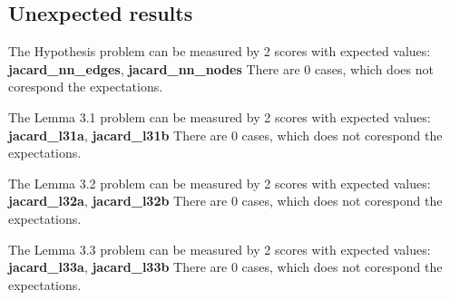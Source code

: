 \documentclass{article}
\begin{document}
\subsection{Unexpected results}

    \par The Hypothesis problem can be measured by 2 scores with expected 
    values: \textbf{jacard\_nn\_edges}, \textbf{jacard\_nn\_nodes}
    There are 0 cases, which does not corespond the expectations. 
    
    \par The Lemma 3.1 problem can be measured by 2 scores with expected 
    values: \textbf{jacard\_l31a}, \textbf{jacard\_l31b}
    There are 0 cases, which does not corespond the expectations. 
    
    \par The Lemma 3.2 problem can be measured by 2 scores with expected 
    values: \textbf{jacard\_l32a}, \textbf{jacard\_l32b}
    There are 0 cases, which does not corespond the expectations. 
    
    \par The Lemma 3.3 problem can be measured by 2 scores with expected 
    values: \textbf{jacard\_l33a}, \textbf{jacard\_l33b}
    There are 0 cases, which does not corespond the expectations. 
    
\end{document}
